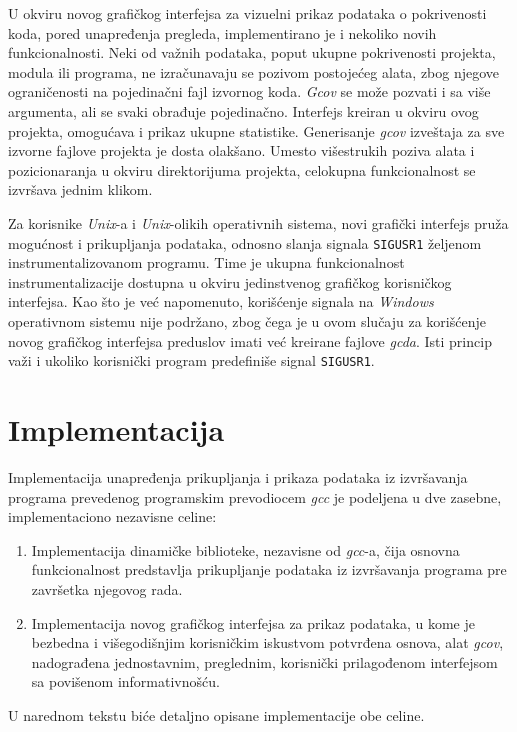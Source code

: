 \documentclass[12pt,oneside]{memoir}
\newcommand{\kod}[1]{\texttt{#1}}
\newcommand{\strano}[1]{\textit{#1}}
\begin{document}
U okviru novog grafičkog interfejsa za vizuelni prikaz podataka o pokrivenosti koda, pored unapređenja pregleda, implementirano je i nekoliko novih funkcionalnosti. Neki od važnih podataka, poput ukupne pokrivenosti projekta, modula ili programa, ne izračunavaju se pozivom postojećeg alata, zbog njegove ograničenosti na pojedinačni fajl izvornog koda. \strano{Gcov} se može pozvati i sa više argumenta, ali se svaki obrađuje pojedinačno. Interfejs kreiran u okviru ovog projekta, omogućava i prikaz ukupne statistike. Generisanje \strano{gcov} izveštaja za sve izvorne fajlove projekta je dosta olakšano. Umesto višestrukih poziva alata i pozicionaranja u okviru direktorijuma projekta, celokupna funkcionalnost se izvršava jednim klikom. 

Za korisnike \strano{Unix}-a i \strano{Unix}-olikih operativnih sistema, novi grafički interfejs pruža mogućnost i prikupljanja podataka, odnosno slanja signala \kod{SIGUSR1} željenom instrumentalizovanom programu. Time je ukupna funkcionalnost instrumentalizacije dostupna u okviru jedinstvenog grafičkog korisničkog interfejsa. Kao što je već napomenuto, korišćenje signala na \strano{Windows} operativnom sistemu nije podržano, zbog čega je u ovom slučaju za korišćenje novog grafičkog interfejsa preduslov imati već kreirane fajlove \strano{gcda}. Isti princip važi i ukoliko korisnički program predefiniše signal \kod{SIGUSR1}.

\chapter{Implementacija}
\label{chp:implementacija}

Implementacija unapređenja prikupljanja i prikaza podataka iz izvršavanja programa prevedenog programskim prevodiocem \strano{gcc} je podeljena u dve zasebne, implementaciono nezavisne celine:
\begin{enumerate}
\item Implementacija dinamičke biblioteke, nezavisne od \strano{gcc}-a, čija osnovna funkcionalnost predstavlja prikupljanje podataka iz izvršavanja programa pre završetka njegovog rada.
\item Implementacija novog grafičkog interfejsa za prikaz podataka, u kome je bezbedna i višegodišnjim korisničkim iskustvom potvrđena osnova, alat \strano{gcov}, nadograđena jednostavnim, preglednim, korisnički prilagođenom interfejsom sa povišenom informativnošću.
\end{enumerate}
U narednom tekstu biće detaljno opisane implementacije obe celine.
\end{document}
